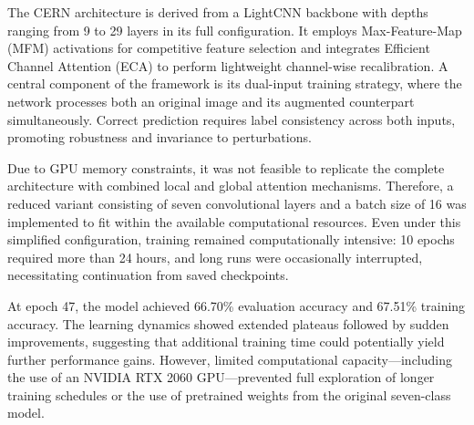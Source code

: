 The CERN architecture is derived from a LightCNN backbone with depths ranging from 9 to 29 layers in its full configuration. It employs Max-Feature-Map (MFM) activations for competitive feature selection and integrates Efficient Channel Attention (ECA) to perform lightweight channel-wise recalibration. A central component of the framework is its dual-input training strategy, where the network processes both an original image and its augmented counterpart simultaneously. Correct prediction requires label consistency across both inputs, promoting robustness and invariance to perturbations.

Due to GPU memory constraints, it was not feasible to replicate the complete architecture with combined local and global attention mechanisms. Therefore, a reduced variant consisting of seven convolutional layers and a batch size of 16 was implemented to fit within the available computational resources. Even under this simplified configuration, training remained computationally intensive: 10 epochs required more than 24 hours, and long runs were occasionally interrupted, necessitating continuation from saved checkpoints.

At epoch 47, the model achieved 66.70\% evaluation accuracy and 67.51\% training accuracy. The learning dynamics showed extended plateaus followed by sudden improvements, suggesting that additional training time could potentially yield further performance gains. However, limited computational capacity—including the use of an NVIDIA RTX 2060 GPU—prevented full exploration of longer training schedules or the use of pretrained weights from the original seven-class model.

